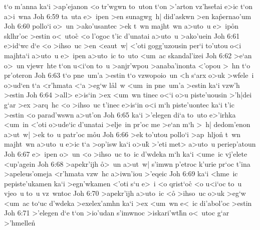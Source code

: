 t`o
m'anna
ka`i
>ap'ejanon
<o
tr'wgwn
to~uton
t`on
>'arton
vz'hse\r{t}ai
e>ic
t`on
a>i~wna\bibvsend
\vs Joh 6:59
ta~uta
e>~ipen
>en
sunagwg~h|
did'askwn
>en
ka\r{p}ernao'um\bibvsend
{}
\vs Joh 6:60
pollo`i
o>~un
>ako'usantec
>ek
t~wn
majht~wn
a>uto~u
e>~ip\r{o}n
sklhr'oc
>estin
o<~utoc\r{}
<o
l'ogoc
t'ic
d'unatai
a>uto~u
>ako'uein\bibvsend
\vs Joh 6:61
e>id`wc
d`e
<o
>ihso~uc
>en
<eaut~w|
<'oti
gogg'uzousin
per`i
to'utou
o<i
majhta`i
a>uto~u
e>~ipen
a>uto~ic
to~uto
<um~ac
skandal'izei\bibvsend
\vs Joh 6:62
>e`an
o>~un
vjewr~hte
t`on
u<i`on
to~u
>anjr'wpou
>anaba'inonta
<'opou
>~hn
t`o
pr'oteron\bibvsend
\vs Joh 6:63
t`o
pne~um'a
>estin
t`o
vzwopoio~un
<h
s`arx
o>uk
>wfele~i
o>ud`en
t`a
<r'hmata
<`a
>eg`w
l\r{a}l~w
<um~in
pne~um'a
>estin
ka`i
vzw'h
>estin\bibvsend
\vs Joh 6:64
>all>
e>is`in
>ex
<um~wn
tinec
o<`i
o>u
piste'uousin
>'h|dei
g`ar
>ex
>arq~hc
<o
>ihso~uc
t'inec
e>is`in
o<i
m`h
piste'uontec
ka`i
t'ic
>estin
<o
parad'wswn
a>ut'on\bibvsend
\vs Joh 6:65
ka`i
>'elegen
di`a
to~uto
e>'irhka
<um~in
<'oti
o>ude`ic
d'unatai
>elje~in
pr'oc
me
>e`an
m`h
>~h|
dedom'enon
a>ut~w|
>ek
to~u
patr'oc
m\r{o}u\bibvsend
{}
\vs Joh 6:66
>ek
to'utou
pollo`i
>ap~hljon\r{}
t~wn
majht~wn
a>uto~u
e>ic
t`a
>op'isw
ka`i
o>uk\r{}
>'eti
met>
a>uto~u
periep'atoun\bibvsend
\vs Joh 6:67
e>~ipen
o>~un
<o
>ihso~uc
to~ic
d'wdeka
m`h
ka`i
<ume~ic
vj'elete
<up'agein\bibvsend
\vs Joh 6:68
>apekr'ijh
\r{o}>~un
a>ut~w|
s'imwn
p'etroc
k'urie
pr`oc
t'ina
>apeleus'omeja
<r'hmata
vzw~hc
a>iwn'iou
>'eqeic\bibvsend
\vs Joh 6:69
ka`i
<hme~ic
pepiste'ukamen
ka`i
>egn'wkamen
<'oti
s`u
e>~i
<o
qrist`oc\r{}
<o
u<i`oc
to~u
vjeo~u
to~u
vz~wntoc\bibvsend
\vs Joh 6:70
>apekr'ijh
a>uto~ic
<o\r{}
>ihso~uc
o>uk
>eg`w
<um~ac
to`uc
d'wdeka
>exelex'amhn
ka`i
>ex
<um~wn
e<~ic
di'abol'oc
>estin\bibvsend
\vs Joh 6:71
>'elegen
d`e
t`on
>io'udan
s'imwnoc
>iskari'wt\r{h}n
o<~utoc
g`ar
>'hmellen\r{}
